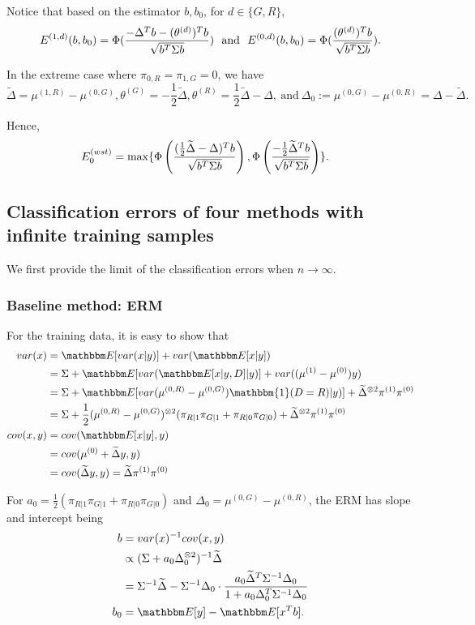 Notice that based on the estimator $b,b_0$, for $d\in\{G,R\}$,
\begin{align}
    \label{err-orginal}
 E^{(1,d)}(b,b_0)=\Phi(\frac{-\Delta^Tb -(\theta^{(d)})^Tb}{\sqrt{b^T\Sigma b}})~~\text{and}~~ E^{(0,d)}(b,b_0)=\Phi(\frac{ (\theta^{(d)})^Tb}{\sqrt{b^T\Sigma b}}).
\end{align}

In the extreme case where $\pi_{0,R}=\pi_{1,G}=0$, we have 
\[
\widetilde{\Delta}=\mu^{(1,R)}-\mu^{(0,G)},\theta^{(G)}=-\frac{1}{2}\widetilde{\Delta},\theta^{(R)}=\frac{1}{2}\widetilde{\Delta}-\Delta,~\text{and}~\Delta_0:=\mu^{(0,G)}-\mu^{(0,R)}=\Delta-\widetilde{\Delta}.
\]

Hence,
\begin{align}
\label{err0}
    E_0^{(wst)}
    &=\max \{\Phi\left(\frac{(\frac{1}{2}\widetilde{\Delta}-\Delta)^Tb}{\sqrt{b^T\Sigma b}}\right),\Phi\left(\frac{-\frac{1}{2}\widetilde{\Delta}^Tb}{\sqrt{b^T\Sigma b}}\right)\}.
\end{align}

\subsection{Classification errors of four methods with infinite training samples}
We first provide the limit of the classification errors when $n\rightarrow \infty$.

\subsubsection{Baseline method: ERM}
For the training data, it is easy to show that
\begin{align*}
    var(x)&=\E[var(x|y)]+var(\E[x|y])\\
     &=\Sigma+\E[var(\E[x|y,D]|y)]+var((\mu^{(1)}-\mu^{(0)})y)\\
    &=\Sigma+\E[var(\mu^{(0,R)}-\mu^{(0,G)})\mathbbm{1}(D=R)|y)]+\widetilde{\Delta}^{\otimes 2}\pi^{(1)}\pi^{(0)}\\
    &=\Sigma+\frac{1}{2}(\mu^{(0,R)}-\mu^{(0,G)})^{\otimes 2}(\pi_{R|1}\pi_{G|1}+\pi_{R|0}\pi_{G|0})+\widetilde{\Delta}^{\otimes 2}\pi^{(1)}\pi^{(0)}\\
    cov(x,y)&=cov(\E[x|y],y)\\
    &=cov(\mu^{(0)}+\widetilde{\Delta}y,y)\\
    &=cov(\widetilde{\Delta}y,y)=\widetilde{\Delta}\pi^{(1)}\pi^{(0)}
\end{align*}

For $a_0=\frac{1}{2}(\pi_{R|1}\pi_{G|1}+\pi_{R|0}\pi_{G|0})$ and $\Delta_0=\mu^{(0,G)}-\mu^{(0,R)}$, the ERM has slope and intercept being
\begin{align*}
    b&=var(x)^{-1}cov(x,y)\\
    &\propto (\Sig+ a_0\Delta_0^{\otimes 2})^{-1}\widetilde{\Delta}\\
    &=\Sig^{-1}\widetilde{\Delta}-\Sig^{-1}\Delta_0\cdot \frac{a_0\widetilde{\Delta}^T\Sig^{-1}\Delta_0}{1+a_0\Delta_0^T\Sig^{-1}\Delta_0}\\
    b_0&=\E[y]-\E[x^Tb].
\end{align*}



